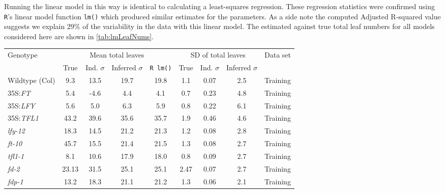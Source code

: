 Running the linear model in this way is identical to calculating a least-squares regression.
These regression statistics were confirmed using \texttt{R}'s \cite{Rcoreteam} linear model function \texttt{lm()} which produced similar estimates for the parameters.
As a side note the computed Adjusted R-squared value suggests we explain 29\% of the variability in the data with this linear model.
The estimated against true total leaf numbers for all models considered here are shown in \autoref{tab:lmLeafNums}.
\begin{table*}[!htbp]
\setlength{\tabcolsep}{5pt}
    \begin{tabular}{@{}lcccccccc@{}}
      \toprule%
      Genotype & \multicolumn{4}{c}{Mean total leaves} & \multicolumn{3}{c}{SD of total leaves} & Data set \\
      \cmidrule(r){2-5} \cmidrule{6-8}
      & True & Ind. $\sigma$ & Inferred $\sigma$ & \texttt{R lm()} & True & Ind. $\sigma$ & Inferred $\sigma$ \\
      \toprule%
      Wildtype (Col)             & 9.3   & 13.5 & 19.7 & 19.8 & 1.1  & 0.07 & 2.5 & Training\\
      35S:\emph{FT}              & 5.4   & -4.6 & 4.4  & 4.1  & 0.7  & 0.23 & 4.8 & Training\\ 
      35S:\emph{LFY}             & 5.6   & 5.0  & 6.3  & 5.9  & 0.8  & 0.22 & 6.1 & Training\\
      35S:\emph{TFL1}            & 43.2  & 39.6 & 35.6 & 35.7 & 1.9  & 0.46 & 4.6 & Training\\
      \emph{lfy-12}              & 18.3  & 14.5 & 21.2 & 21.3 & 1.2  & 0.08 & 2.8 & Training\\
      \emph{ft-10}               & 45.7  & 15.5 & 21.4 & 21.5 & 1.3  & 0.08 & 2.7 & Training\\
      \emph{tfl1-1}              & 8.1   & 10.6 & 17.9 & 18.0 & 0.8  & 0.09 & 2.7 & Training\\
      \emph{fd-2}                & 23.13 & 31.5 & 25.1 & 25.1 & 2.47 & 0.07 & 2.7 & Training\\
      \emph{fdp-1}               & 13.2  & 18.3 & 21.1 & 21.2 & 1.3  & 0.06 & 2.1 & Training\\

\end{tabular}
\end{table*}
